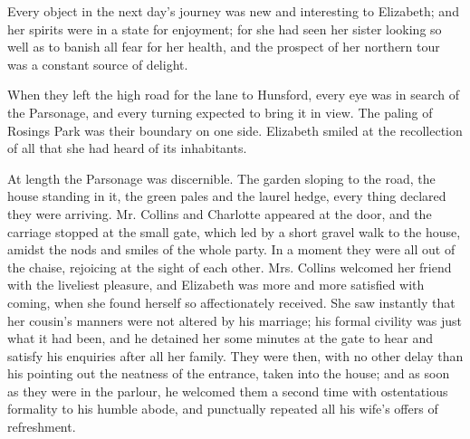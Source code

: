 
Every object in the next day’s journey was new and
interesting to Elizabeth; and her spirits were in a state
for enjoyment; for she had seen her sister looking so well
as to banish all fear for her health, and the prospect of her
northern tour was a constant source of delight.

When they left the high road for the lane to Hunsford,
every eye was in search of the Parsonage, and every
turning expected to bring it in view. The paling of Rosings
Park was their boundary on one side. Elizabeth smiled
at the recollection of all that she had heard of its
inhabitants.

At length the Parsonage was discernible. The garden
sloping to the road, the house standing in it, the green
pales and the laurel hedge, every thing declared they
were arriving. Mr. Collins and Charlotte appeared at the
door, and the carriage stopped at the small gate, which
led by a short gravel walk to the house, amidst the nods
and smiles of the whole party. In a moment they were
all out of the chaise, rejoicing at the sight of each other.
Mrs. Collins welcomed her friend with the liveliest pleasure,
and Elizabeth was more and more satisfied with coming,
when she found herself so affectionately received. She
saw instantly that her cousin’s manners were not altered
by his marriage; his formal civility was just what it had
been, and he detained her some minutes at the gate to
hear and satisfy his enquiries after all her family. They
were then, with no other delay than his pointing out the
neatness of the entrance, taken into the house; and as
soon as they were in the parlour, he welcomed them a
second time with ostentatious formality to his humble
abode, and punctually repeated all his wife’s offers of
refreshment.


